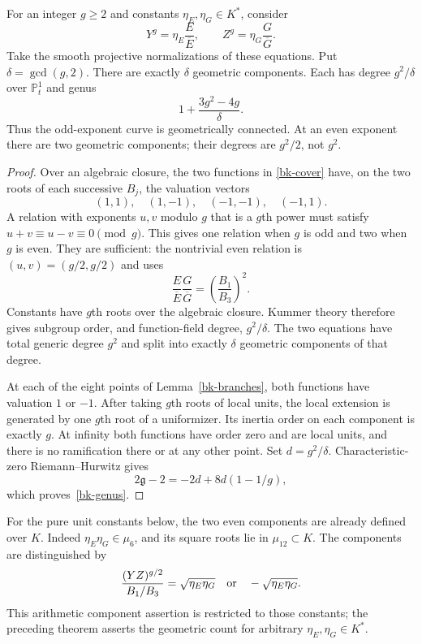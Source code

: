 \begin{theorem}\label{bk-degree-genus}
For an integer $g\ge2$ and constants $\eta_E,\eta_G\in K^*$, consider
\begin{equation}\label{bk-cover}
 Y^g=\eta_E\frac E{\overline E},\qquad
 Z^g=\eta_G\frac G{\overline G}.
\end{equation}
Take the smooth projective normalizations of these equations.
Put $\delta=\gcd(g,2)$. There are exactly $\delta$
geometric components. Each has degree $g^2/\delta$ over
$\mathbb P^1_t$ and genus
\begin{equation}\label{bk-genus}
 1+\frac{3g^2-4g}{\delta}.
\end{equation}
Thus the odd-exponent curve is geometrically connected. At an even
exponent there are two geometric components; their degrees are
$g^2/2$, not $g^2$.
\end{theorem}
\begin{proof}
Over an algebraic closure, the two functions in
\eqref{bk-cover} have, on the two roots of each successive $B_j$,
the valuation vectors
\begin{equation}\label{bk-valuation-matrix}
 (1,1),\quad(1,-1),\quad(-1,-1),\quad(-1,1).
\end{equation}
A relation with exponents $u,v$ modulo $g$ that is a $g$th power must
satisfy $u+v\equiv u-v\equiv0\pmod g$. This gives one relation
when $g$ is odd and two when $g$ is even. They are sufficient: the
nontrivial even relation is $(u,v)=(g/2,g/2)$ and uses
\[
 \frac E{\overline E}\frac G{\overline G}
   =\left(\frac{B_1}{B_3}\right)^2.
\]
Constants have $g$th roots over the algebraic closure. Kummer theory
therefore gives subgroup order, and function-field degree,
$g^2/\delta$. The two equations have total generic degree $g^2$ and
split into exactly $\delta$ geometric components of that degree.

At each of the eight points of Lemma~\ref{bk-branches}, both functions
have valuation $1$ or $-1$. After taking $g$th roots of local units,
the local extension is generated by one $g$th root of a uniformizer.
Its inertia order on each component is exactly $g$. At infinity both
functions have order zero and are local units, and there is no
ramification there or at any other point. Set $d=g^2/\delta$.
Characteristic-zero Riemann--Hurwitz gives
\[
 2\mathfrak g-2=-2d+8d(1-1/g),
\]
which proves~\eqref{bk-genus}.
\end{proof}
For the pure unit constants below, the two even components are already
defined over $K$. Indeed $\eta_E\eta_G\in\mu_6$, and its square
roots lie in $\mu_{12}\subset K$. The components are distinguished by
\begin{equation}\label{bk-even-components}
 \frac{(YZ)^{g/2}}{B_1/B_3}
   =\sqrt{\eta_E\eta_G}\quad\hbox{or}\quad
    -\sqrt{\eta_E\eta_G}.
\end{equation}
This arithmetic component assertion is restricted to those constants;
the preceding theorem asserts the geometric count for arbitrary
$\eta_E,\eta_G\in K^*$.

